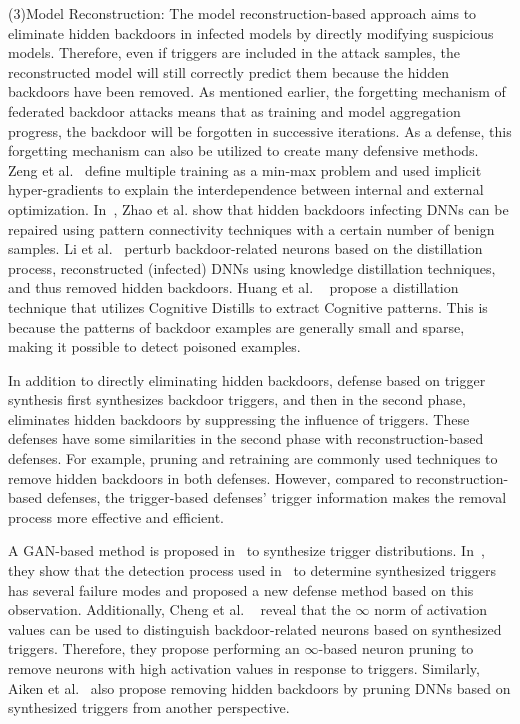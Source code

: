 \documentclass[pdflatex,sn-mathphys-num]{sn-jnl}%
\theoremstyle{thmstyleone}%
\theoremstyle{thmstyletwo}%
\theoremstyle{thmstylethree}%
\begin{document}
(3)Model Reconstruction: The model reconstruction-based
approach aims to eliminate hidden backdoors in infected
models by directly modifying suspicious models.
Therefore, even if triggers are included in the attack
samples, the reconstructed model will still correctly predict
them because the hidden backdoors have been removed. As mentioned earlier, the forgetting mechanism of
federated backdoor attacks means that as training and
model aggregation progress, the backdoor will be forgotten
in successive iterations. As a defense, this forgetting
mechanism can also be utilized to create many defensive
methods. Zeng et al.~\cite{zeng2021adversarial} define multiple training as a min-max
problem and used implicit hyper-gradients to explain the
interdependence between internal and external optimization.
In~\cite{zhao2020bridging}, Zhao et al. show that hidden backdoors
infecting DNNs can be repaired using pattern connectivity
techniques with a certain number of benign samples. Li et al.~\cite{yoshida2020disabling} perturb backdoor-related neurons based
on the distillation process, reconstructed (infected) DNNs
using knowledge distillation techniques, and
thus removed hidden backdoors. Huang et al. ~\cite{huang2023distilling} propose a
distillation technique that utilizes Cognitive Distills to
extract Cognitive patterns. This is because the patterns of
backdoor examples are generally small and sparse, making
it possible to detect poisoned examples.

In addition to directly eliminating hidden backdoors,
defense based on trigger synthesis first synthesizes
backdoor triggers, and then in the second phase, eliminates
hidden backdoors by suppressing the influence of triggers.
These defenses have some similarities in the second phase
with reconstruction-based defenses. For example, pruning
and retraining are commonly used techniques to remove
hidden backdoors in both defenses. However, compared to
reconstruction-based defenses, the trigger-based defenses'
trigger information makes the removal process more effective and eﬀicient.

A GAN-based method is proposed in~\cite{zhu2020gangsweep} to synthesize
trigger distributions. In~\cite{guo2020towards}, they show that the detection
process used in~\cite{wang2019neural} to determine synthesized triggers has
several failure modes and proposed a new defense method
based on this observation. Additionally, Cheng et al. ~\cite{xu2020defending}
reveal that the $\infty$ norm of activation values can be used to
distinguish backdoor-related neurons based on synthesized
triggers. Therefore, they propose performing an $\infty$-based
neuron pruning to remove neurons with high activation
values in response to triggers. Similarly, Aiken et al.~\cite{aiken2021neural}
also propose removing hidden backdoors by pruning DNNs
based on synthesized triggers from another perspective.
\end{document}
